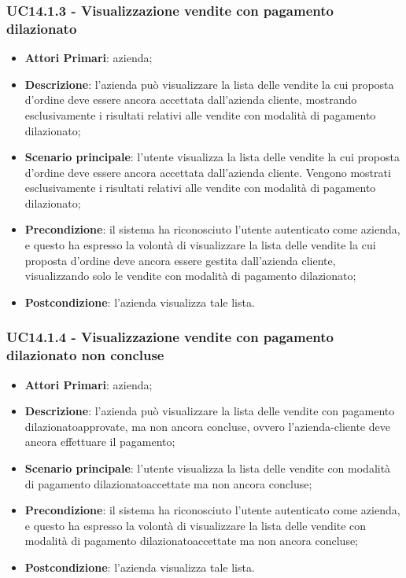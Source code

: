 \subsubsection{UC14.1.3 - Visualizzazione vendite con pagamento dilazionato}
\begin{itemize}
	\item \textbf{Attori Primari}: azienda;
	\item \textbf{Descrizione}: l'azienda può visualizzare la lista delle vendite la cui proposta d'ordine deve essere ancora accettata dall'azienda cliente, mostrando esclusivamente i risultati relativi alle vendite con modalità di pagamento dilazionato\glo;
	\item \textbf{Scenario principale}: l'utente visualizza la lista delle vendite la cui proposta d'ordine deve essere ancora accettata dall'azienda cliente. Vengono mostrati esclusivamente i risultati relativi alle vendite con modalità di pagamento dilazionato\glo;
	\item \textbf{Precondizione}: il sistema ha riconosciuto l'utente autenticato come azienda, e questo ha espresso la volontà di visualizzare la lista delle vendite la cui proposta d'ordine deve ancora essere gestita dall'azienda cliente, visualizzando solo le vendite con modalità di pagamento dilazionato\glo;
	\item \textbf{Postcondizione}: l'azienda visualizza tale lista.
\end{itemize}


\subsubsection{UC14.1.4 - Visualizzazione vendite con pagamento dilazionato non concluse}
\begin{itemize}
	\item \textbf{Attori Primari}: azienda;
	\item \textbf{Descrizione}: l'azienda può visualizzare la lista delle vendite con pagamento dilazionato\glosp approvate, ma non ancora concluse, ovvero l'azienda-cliente deve ancora effettuare il pagamento;
	\item \textbf{Scenario principale}: l'utente visualizza la lista delle vendite con modalità di pagamento dilazionato\glosp accettate ma non ancora concluse;
	\item \textbf{Precondizione}: il sistema ha riconosciuto l'utente autenticato come azienda, e questo ha espresso la volontà di visualizzare la lista delle vendite con modalità di pagamento dilazionato\glosp accettate ma non ancora concluse;
	\item \textbf{Postcondizione}: l'azienda visualizza tale lista.
\end{itemize}

